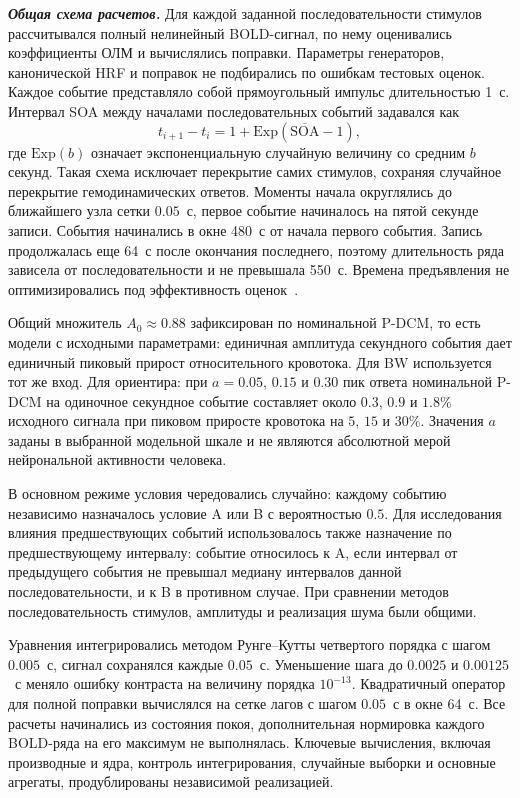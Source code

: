\textbf{\textit{Общая схема расчетов.}} Для каждой заданной последовательности стимулов рассчитывался полный нелинейный BOLD-сигнал, по нему оценивались коэффициенты ОЛМ и вычислялись поправки. Параметры генераторов, канонической HRF и поправок не подбирались по ошибкам тестовых оценок. Каждое событие представляло собой прямоугольный импульс длительностью 1~с. Интервал SOA между началами последовательных событий задавался как
\[
t_{i+1}-t_i=1+\mathrm{Exp}(\overline{\mathrm{SOA}}-1),
\]
где $\mathrm{Exp}(b)$ означает экспоненциальную случайную величину со средним $b$ секунд. Такая схема исключает перекрытие самих стимулов, сохраняя случайное перекрытие гемодинамических ответов. Моменты начала округлялись до ближайшего узла сетки $0.05$~с, первое событие начиналось на пятой секунде записи. События начинались в окне 480~с от начала первого события. Запись продолжалась еще 64~с после окончания последнего, поэтому длительность ряда зависела от последовательности и не превышала 550~с. Времена предъявления не оптимизировались под эффективность оценок~\cite{wager2003}.

Общий множитель $A_0\approx0.88$ зафиксирован по номинальной P-DCM, то есть модели с исходными параметрами: единичная амплитуда секундного события дает единичный пиковый прирост относительного кровотока. Для BW используется тот же вход. Для ориентира: при $a=0.05$, $0.15$ и $0.30$ пик ответа номинальной P-DCM на одиночное секундное событие составляет около $0.3$, $0.9$ и $1.8\%$ исходного сигнала при пиковом приросте кровотока на $5$, $15$ и $30\%$. Значения $a$ заданы в выбранной модельной шкале и не являются абсолютной мерой нейрональной активности человека.

В основном режиме условия чередовались случайно: каждому событию независимо назначалось условие A или B с вероятностью $0.5$. Для исследования влияния предшествующих событий использовалось также назначение по предшествующему интервалу: событие относилось к A, если интервал от предыдущего события не превышал медиану интервалов данной последовательности, и к B в противном случае. При сравнении методов последовательность стимулов, амплитуды и реализация шума были общими.

Уравнения интегрировались методом Рунге--Кутты четвертого порядка с шагом $0.005$~с, сигнал сохранялся каждые $0.05$~с. Уменьшение шага до $0.0025$ и $0.00125$~с меняло ошибку контраста на величину порядка $10^{-13}$. Квадратичный оператор для полной поправки вычислялся на сетке лагов с шагом $0.05$~с в окне 64~с. Все расчеты начинались из состояния покоя, дополнительная нормировка каждого BOLD-ряда на его максимум не выполнялась. Ключевые вычисления, включая производные и ядра, контроль интегрирования, случайные выборки и основные агрегаты, продублированы независимой реализацией.

